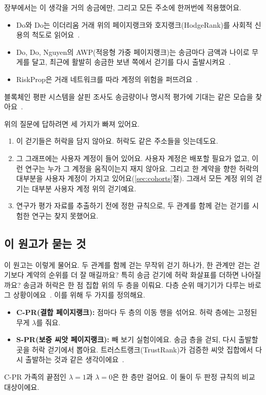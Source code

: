 장부에서는 이 생각을 거의 송금에만, 그리고 모든 주소에 한꺼번에 적용했어요.
\begin{itemize}
\item Do와 Do는 이더리움 거래 위의 페이지랭크와 호지랭크(HodgeRank)를 사회적 신용의 척도로 읽어요~\cite{do2023hodgerank}.
\item Do, Do, Nguyen의 AWP(적응형 가중 페이지랭크)는 송금마다 금액과 나이로 무게를 달고, 최근에 활발히 송금한 보낸 쪽에서 걷기를 다시 출발시켜요~\cite{do2023awp}.
\item RiskProp은 거래 네트워크를 따라 계정의 위험을 퍼뜨려요~\cite{lin2025riskprop}.
\end{itemize}
블록체인 평판 시스템을 살핀 조사도 송금량이나 명시적 평가에 기대는 같은 모습을 찾아요~\cite{bellini2020trust}.

위의 질문에 답하려면 세 가지가 빠져 있어요.
\begin{enumerate}
\item 이 걷기들은 허락을 담지 않아요. 허락도 같은 주소들을 잇는데도요.
\item 그 그래프에는 사용자 계정이 들어 있어요. 사용자 계정은 배포할 필요가 없고, 이런 연구는 누가 그 계정을 움직이는지 재지 않아요. 그리고 한 계약을 향한 허락의 대부분을 사용자 계정이 가지고 있어요(\ref{sec:cohorts}절). 그래서 모든 계정 위의 걷기는 대부분 사용자 계정 위의 걷기예요.
\item 연구가 평가 자료를 추출하기 전에 정한 규칙으로, 두 관계를 함께 걷는 걷기를 시험한 연구는 찾지 못했어요.
\end{enumerate}

\subsection{이 원고가 묻는 것}

이 원고는 이렇게 물어요. 두 관계를 함께 걷는 무작위 걷기 하나가, 한 관계만 걷는 걷기보다 계약의 순위를 더 잘 매길까요? 특히 송금 걷기에 허락 화살표를 더하면 나아질까요? 송금과 허락은 한 점 집합 위의 두 층을 이뤄요. 다층 순위 매기기가 다루는 바로 그 상황이에요~\cite{halu2013multiplex,dedomenico2015ranking}. 이를 위해 두 가지를 정의해요.
\begin{itemize}
\item \textbf{C-PR(결합 페이지랭크):} 점마다 두 층의 이동 행을 섞어요. 허락 층에는 고정된 무게 $\lambda$를 줘요.
\item \textbf{S-PR(보증 씨앗 페이지랭크):} 빼 보기 실험이에요. 송금 층을 걷되, 다시 출발할 곳을 허락 걷기에서 뽑아요. 트러스트랭크(TrustRank)가 검증한 씨앗 집합에서 다시 출발하는 것과 같은 생각이에요~\cite{gyongyi2004trustrank}.
\end{itemize}
C-PR 가족의 끝점인 $\lambda=1$과 $\lambda=0$은 한 층만 걸어요. 이 둘이 두 판정 규칙의 비교 대상이에요.

